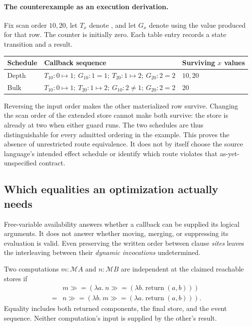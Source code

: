 \paragraph{The counterexample as an execution derivation.}
Fix scan order $10,20$, let $T_x$ denote , and let $G_x$
denote  using the value produced for that row. The counter
is initially zero. Each table entry records a state transition and a result.
\begin{center}\small
\begin{tabular}{lll}\toprule
Schedule & Callback sequence & Surviving $x$ values \\
\midrule
Depth & $T_{10}:0\mapsto1;\ G_{10}:1=1;\
          T_{20}:1\mapsto2;\ G_{20}:2=2$ & $10,20$ \\
Bulk & $T_{10}:0\mapsto1;\ T_{20}:1\mapsto2;\
         G_{10}:2\ne1;\ G_{20}:2=2$ & $20$ \\
\bottomrule
\end{tabular}
\end{center}
Reversing the input order makes the other materialized row survive. Changing
the scan order of the extended store cannot make both survive: the store is
already at two when either guard runs. The two schedules are thus
distinguishable for every admitted ordering in the example. This proves the
absence of unrestricted route equivalence. It does not by itself choose the
source language's intended effect schedule or identify which route violates
that as-yet-unspecified contract.

\subsection{Which equalities an optimization actually needs}
\label{sec:effect-laws}
Free-variable availability answers whether a callback can be supplied its
logical arguments. It does not answer whether moving, merging, or suppressing
its evaluation is valid. Even preserving the written order between clause
\emph{sites} leaves the interleaving between their \emph{dynamic invocations}
undetermined.

\begin{definition}
Two computations $m:\mathcal M A$ and $n:\mathcal M B$ are independent at
the claimed reachable stores if
\[
\begin{aligned}
 &m\mathbin{\gg=}(\lambda a.\
 n\mathbin{\gg=}(\lambda b.\operatorname{return}(a,b)))\\
 ={}&n\mathbin{\gg=}(\lambda b.\
 m\mathbin{\gg=}(\lambda a.\operatorname{return}(a,b))).
\end{aligned}
\]
Equality includes both returned components, the final store, and the event
sequence. Neither computation's input is supplied by the other's result.
\end{definition}

